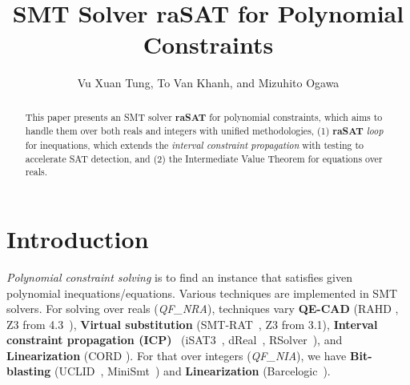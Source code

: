 \documentclass[runningheads,a4paper,oribibl]{llncs}
\begin{document}
%

\title{SMT Solver raSAT for Polynomial Constraints}
\author{Vu Xuan Tung, To Van Khanh, and Mizuhito Ogawa} 


\maketitle

\begin{abstract}
  This paper presents an SMT solver {\bf raSAT} for polynomial constraints, 
  which aims to handle them over both reals and integers with
  unified methodologies, (1) {\bf raSAT} {\em loop} for inequations,
  which extends the \emph{interval constraint propagation}
  with testing to accelerate SAT detection, and 
  (2) the Intermediate Value Theorem for equations over reals. 
\end{abstract}


\section{Introduction}
{\em Polynomial constraint solving} is to find an instance that satisfies given
polynomial inequations/equations. Various techniques are implemented in SMT solvers.
For solving over reals (\emph{QF\_NRA}), techniques vary 
{\bf QE-CAD} (RAHD \cite{Passmore09combineddecision}, 
  Z3 from 4.3~\cite{Jovanovic13}), 
{\bf Virtual substitution} (SMT-RAT~\cite{smtrat}, 
  Z3 from 3.1), 
{\bf Interval constraint propagation (ICP)}~\cite{benhamou:hal-00480814}
(iSAT3~\cite{isat}, dReal~\cite{dRealCADE13}, RSolver~\cite{rsolver}),
and 
{\bf Linearization} (CORD \cite{cordic}). 
For that over integers (\emph{QF\_NIA}), we have 
{\bf Bit-blasting} (UCLID~\cite{Bryant07decidingbit-vector}, 
  MiniSmt~\cite{Zankl:2010:SNR:1939141.1939168}) and 
{\bf Linearization} (Barcelogic~\cite{Barcelogic08}). 
\end{document}
